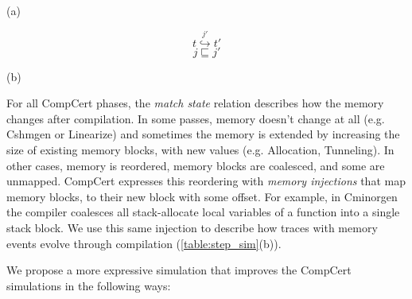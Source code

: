 \begin{table}\centering
\begin{multicols}{2}

\



\

(a)
\begin{multicols}{2}

$$t \overset{j'}{\hookrightarrow} t'$$
$$j \sqsubseteq j'$$
\end{multicols}

(b)
\end{multicols}
\caption{Step simulation step diagrams. (a) if $s_1$ takes a step to $s_2$ with trace $t$ and $s_1$ is related to some $s_2$, then there $s_2$ can take a number of steps with trace $t$ to a new state $2_2'$ related to $s_1'$. (b) The new diagram exposes the memory reordering injections $j$ and $j'$ and the traces $t$ and $t'$ are equivalent up to injection, by . }\label{table:step_sim}
\end{table}
For all CompCert phases, the \emph{match state} relation describes how the memory changes after compilation. In some passes, memory doesn't change at all (e.g. Cshmgen or Linearize) and sometimes the memory is extended by increasing the size of existing memory blocks, with new values (e.g. Allocation, Tunneling). In other cases, memory is reordered, memory blocks are coalesced, and some are unmapped. CompCert expresses this reordering with \emph{memory injections} that map memory blocks, to their new block with some offset. For example, in Cminorgen the compiler coalesces all stack-allocate local variables of a function into a single stack block. We use this same injection to describe how traces with memory events evolve through compilation (\ref{table:step_sim}(b)).

We propose a more expressive simulation  that improves the CompCert simulations in the following ways:

